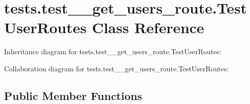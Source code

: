 \hypertarget{classtests_1_1test__3__get__users__route_1_1_test_user_routes}{}\section{tests.\+test\+\_\+\_\+get\+\_\+users\+\_\+route.\+Test\+User\+Routes Class Reference}
\label{classtests_1_1test__3__get__users__route_1_1_test_user_routes}


Inheritance diagram for tests.\+test\+\_\+\_\+get\+\_\+users\+\_\+route.\+Test\+User\+Routes\+:


Collaboration diagram for tests.\+test\+\_\+\_\+get\+\_\+users\+\_\+route.\+Test\+User\+Routes\+:
\subsection*{Public Member Functions}

